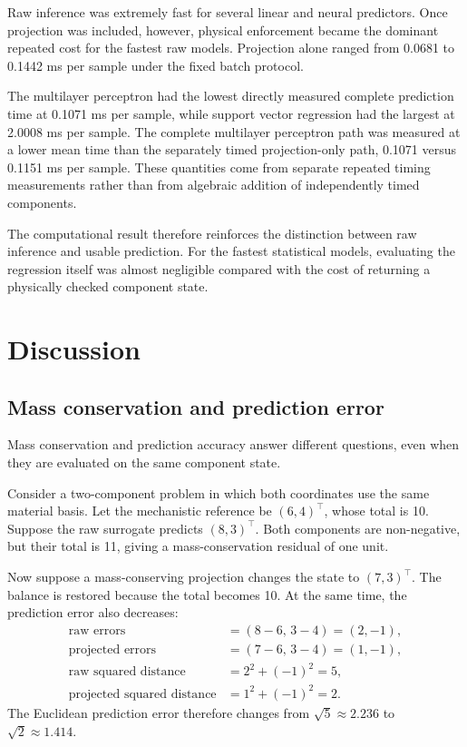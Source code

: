 Raw inference was extremely fast for several linear and neural predictors. Once projection was included, however, physical enforcement became the dominant repeated cost for the fastest raw models. Projection alone ranged from 0.0681 to 0.1442 ms per sample under the fixed batch protocol.

The multilayer perceptron had the lowest directly measured complete prediction time at 0.1071 ms per sample, while support vector regression had the largest at 2.0008 ms per sample. The complete multilayer perceptron path was measured at a lower mean time than the separately timed projection-only path, 0.1071 versus 0.1151 ms per sample. These quantities come from separate repeated timing measurements rather than from algebraic addition of independently timed components.

The computational result therefore reinforces the distinction between raw inference and usable prediction. For the fastest statistical models, evaluating the regression itself was almost negligible compared with the cost of returning a physically checked component state.

\section{Discussion}
\label{sec:projection_discussion}

\subsection{Mass conservation and prediction error}

Mass conservation and prediction accuracy answer different questions, even when they are evaluated on the same component state.

Consider a two-component problem in which both coordinates use the same material basis. Let the mechanistic reference be $(6,4)^\top$, whose total is 10. Suppose the raw surrogate predicts $(8,3)^\top$. Both components are non-negative, but their total is 11, giving a mass-conservation residual of one unit.

Now suppose a mass-conserving projection changes the state to $(7,3)^\top$. The balance is restored because the total becomes 10. At the same time, the prediction error also decreases:
\[
\begin{aligned}
\text{raw errors}&=(8-6,\,3-4)=(2,-1),\\
\text{projected errors}&=(7-6,\,3-4)=(1,-1),\\
\text{raw squared distance}&=2^2+(-1)^2=5,\\
\text{projected squared distance}&=1^2+(-1)^2=2.
\end{aligned}
\]
The Euclidean prediction error therefore changes from
$\sqrt5\approx2.236$
to
$\sqrt2\approx1.414$.

